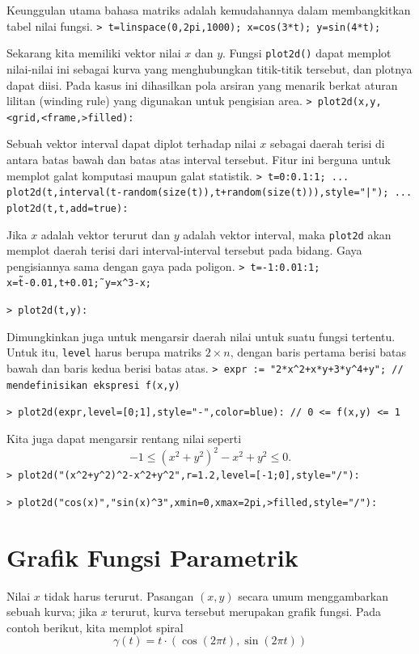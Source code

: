 \documentclass[11pt, a4paper]{article}
\newcommand{\emtcmd}[1]{\noindent\texttt{\textcolor{emtcommand}{>}\ #1}\par\smallskip}
\begin{document}
Keunggulan utama bahasa matriks adalah kemudahannya dalam membangkitkan tabel nilai fungsi.
\emtcmd{t=linspace(0,2pi,1000); x=cos(3*t); y=sin(4*t);}

Sekarang kita memiliki vektor nilai $x$ dan $y$. Fungsi \texttt{plot2d()} dapat memplot nilai-nilai ini sebagai kurva yang menghubungkan titik-titik tersebut, dan plotnya dapat diisi. Pada kasus ini dihasilkan pola arsiran yang menarik berkat aturan lilitan (winding rule) yang digunakan untuk pengisian area.
\emtcmd{plot2d(x,y,<grid,<frame,>filled):}

Sebuah vektor interval dapat diplot terhadap nilai $x$ sebagai daerah terisi di antara batas bawah dan batas atas interval tersebut. Fitur ini berguna untuk memplot galat komputasi maupun galat statistik.
\emtcmd{t=0:0.1:1; ... \\
\hspace*{1em} plot2d(t,interval(t-random(size(t)),t+random(size(t))),style="|"); ... \\
\hspace*{1em} plot2d(t,t,add=true):}

Jika $x$ adalah vektor terurut dan $y$ adalah vektor interval, maka \texttt{plot2d} akan memplot daerah terisi dari interval-interval tersebut pada bidang. Gaya pengisiannya sama dengan gaya pada poligon.
\emtcmd{t=-1:0.01:1; x=\~t-0.01,t+0.01\~; y=x\^{}3-x;}
\emtcmd{plot2d(t,y):}

Dimungkinkan juga untuk mengarsir daerah nilai untuk suatu fungsi tertentu. Untuk itu, \texttt{level} harus berupa matriks $2 \times n$, dengan baris pertama berisi batas bawah dan baris kedua berisi batas atas.
\emtcmd{expr := "2*x\^{}2+x*y+3*y\^{}4+y"; \textcolor{emtcomment}{// mendefinisikan ekspresi f(x,y)}}
\emtcmd{plot2d(expr,level=[0;1],style="-",color=blue): \textcolor{emtcomment}{// 0 <= f(x,y) <= 1}}

Kita juga dapat mengarsir rentang nilai seperti
$$-1 \le (x^2+y^2)^2-x^2+y^2 \le 0.$$
\emtcmd{plot2d("(x\^{}2+y\^{}2)\^{}2-x\^{}2+y\^{}2",r=1.2,level=[-1;0],style="/"):}
\emtcmd{plot2d("cos(x)","sin(x)\^{}3",xmin=0,xmax=2pi,>filled,style="/"):}

\section*{Grafik Fungsi Parametrik}

Nilai $x$ tidak harus terurut. Pasangan $(x,y)$ secara umum menggambarkan sebuah kurva; jika $x$ terurut, kurva tersebut merupakan grafik fungsi. Pada contoh berikut, kita memplot spiral
$$\gamma(t) = t \cdot (\cos(2\pi t),\sin(2\pi t))$$
\end{document}
